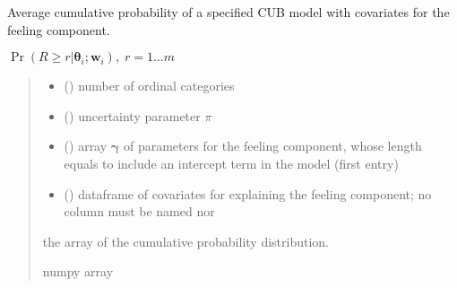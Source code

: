 \documentclass[letterpaper,10pt,english]{sphinxmanual}
\begin{document}
\begin{fulllineitems}
\label{\detokenize{cubmods:cubmods.cub_0w.cmf}}
\pysigstartsignatures
{}
\pysigstopsignatures
\sphinxAtStartPar
Average cumulative probability of a specified CUB model
with covariates for the feeling component.

\sphinxAtStartPar
\(\Pr(R \geq r | \pmb\theta_i ; \pmb w_i),\; r=1 \ldots m\)
\begin{quote}\begin{description}
\begin{itemize}
\item {} 
\sphinxAtStartPar
{} () \textendash{} number of ordinal categories

\item {} 
\sphinxAtStartPar
{} () \textendash{} uncertainty parameter \(\pi\)

\item {} 
\sphinxAtStartPar
{} () \textendash{} array \(\pmb \gamma\) of parameters for the feeling component, whose length equals 
 to include an intercept term in the model (first entry)

\item {} 
\sphinxAtStartPar
{} () \textendash{} dataframe of covariates for explaining the feeling component;
no column must be named  nor 

\end{itemize}

\sphinxAtStartPar
the array of the cumulative probability distribution.

\sphinxAtStartPar
numpy array

\end{description}\end{quote}

\end{fulllineitems}
\end{document}

